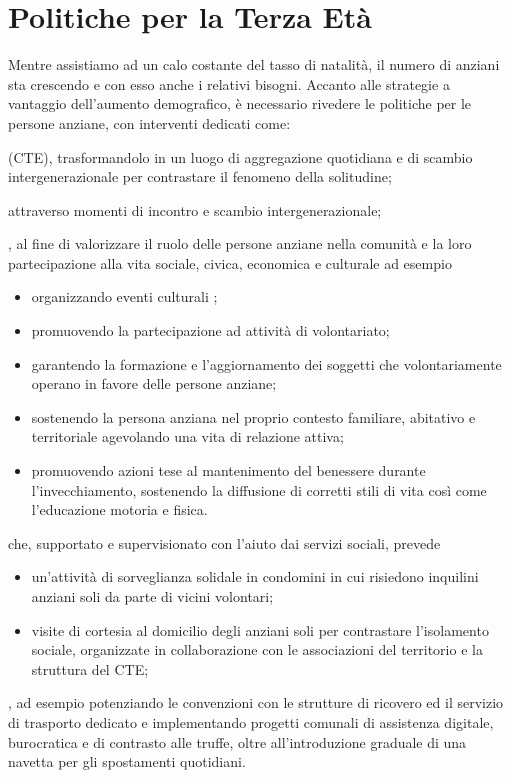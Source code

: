 \section{Politiche per la Terza Età}
Mentre assistiamo ad un calo costante del tasso di natalità, il numero di anziani sta crescendo e con esso anche i relativi bisogni. Accanto alle strategie a vantaggio dell'aumento demografico, è necessario rivedere le politiche per le persone anziane, con interventi dedicati come:

 (CTE), trasformandolo in un luogo di aggregazione quotidiana e di scambio intergenerazionale per contrastare il fenomeno della solitudine;

attraverso momenti di incontro e scambio intergenerazionale;

\begin{bluebox}
, al fine di valorizzare il ruolo delle persone anziane nella comunità e la loro partecipazione alla vita sociale, civica, economica e culturale ad esempio
\begin{itemize}
  \item organizzando eventi culturali %
  ;
  \item promuovendo la partecipazione ad attività di volontariato;
  \item garantendo la formazione e l'aggiornamento dei soggetti che volontariamente operano in favore delle persone anziane; 
  \item sostenendo la persona anziana nel proprio contesto familiare, abitativo e territoriale agevolando una vita di relazione attiva;
  \item promuovendo  azioni tese al mantenimento del benessere durante l'invecchiamento, sostenendo la diffusione di corretti stili di vita così come l'educazione motoria e fisica.
\end{itemize}
\end{bluebox}

 che, supportato e supervisionato con l'aiuto dai servizi sociali, prevede 
\begin{itemize}
  \item un'attività di sorveglianza solidale in condomini in cui risiedono inquilini anziani soli da parte di vicini volontari;  
  \item visite di cortesia al domicilio degli anziani soli per contrastare l'isolamento sociale, organizzate in collaborazione con le associazioni del territorio e la struttura del CTE;
\end{itemize}

, ad esempio potenziando le convenzioni con le strutture di ricovero ed il servizio di trasporto dedicato e implementando progetti comunali di assistenza digitale, burocratica e di contrasto alle truffe, oltre all'introduzione graduale di una navetta per gli spostamenti quotidiani.
